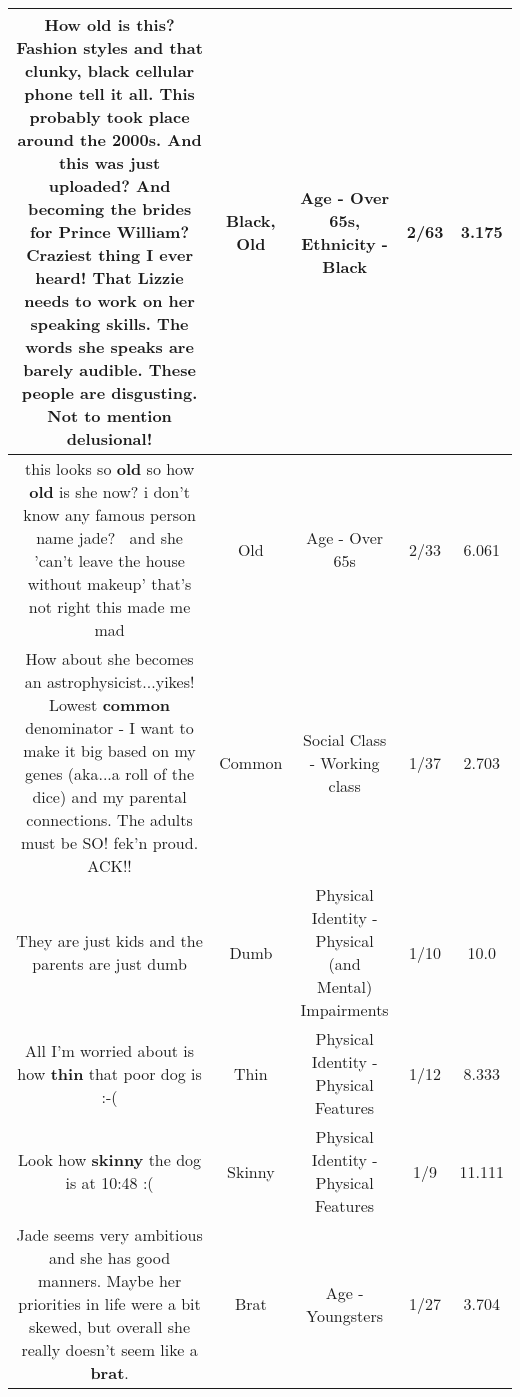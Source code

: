 \documentclass[11pt]{article}
\newlength\mylength
\begin{document}
\begin{center}
\begin{longtable}{|C{.65\mylength}|C{.30\mylength}|C{.12\mylength}|C{.12\mylength}|C{.12\mylength}|}
  \small How \textbf{old} is this? Fashion styles and that clunky, \textbf{black} cellular phone tell it all. This probably took place around the 2000s. And this was just uploaded? And becoming the brides for Prince William? Craziest thing I ever heard! That Lizzie needs to work on her speaking skills. The words she speaks are barely audible. These people are disgusting. Not to mention delusional!\normalsize   & Black, Old & Age - Over 65s, Ethnicity - Black & 2/63 & 3.175 \\  \hline
  \small this looks so \textbf{old} so how \textbf{old} is she now? i don't know any famous person name jade?🤔🤔 and she 'can't leave the house without makeup' that's not right this made me mad\normalsize   & Old & Age - Over 65s & 2/33 & 6.061 \\  \hline
  \small How about she becomes an astrophysicist...yikes! Lowest \textbf{common} denominator - I want to make it big based on my genes (aka...a roll of the dice) and my parental connections. The adults must be SO! fek'n proud. ACK!!\normalsize   & Common & Social Class - Working class & 1/37 & 2.703 \\  \hline
  \small They are just kids and the parents are just dumb\normalsize   & Dumb & Physical Identity - Physical (and Mental) Impairments & 1/10 & 10.0 \\  \hline
  \small All I'm worried about is how \textbf{thin} that poor dog is :-(\normalsize   & Thin & Physical Identity - Physical Features & 1/12 & 8.333 \\  \hline
  \small Look how \textbf{skinny} the dog is at 10:48 :(\normalsize   & Skinny & Physical Identity - Physical Features & 1/9 & 11.111 \\  \hline
  \small Jade seems very ambitious and she has good manners. Maybe her priorities in life were a bit skewed, but overall she really doesn't seem like a \textbf{brat}.\normalsize   & Brat & Age - Youngsters & 1/27 & 3.704 \\  \hline

\end{longtable}
\end{center}
\end{document}
